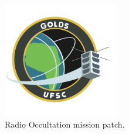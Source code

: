 \begin{figure}[!htb]
    \begin{center}
        \includegraphics[width=0.45\textwidth]{figures/golds-ufsc-patch.png}
        \caption{Radio Occultation mission patch.}
        \label{fig:mission-patch}
    \end{center}
\end{figure}
